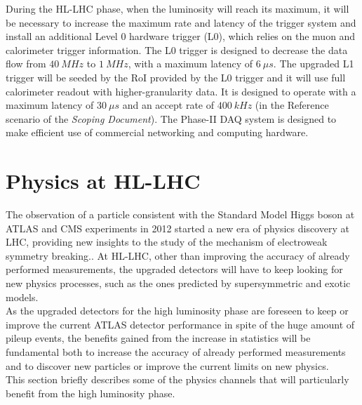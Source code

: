 \documentclass[a4paper,twoside,12pt]{article}
\begin{document}
During the HL-LHC phase, when the luminosity will reach its maximum, it will be necessary
to increase the maximum rate and latency of the trigger system and install an additional Level 0 hardware trigger (L0), which relies on the muon and calorimeter trigger information. The L0 trigger is designed to decrease the data flow from $40\ MHz$ to $1\ MHz$, with a maximum latency of $6\ \mu s$. The upgraded L1 trigger will be seeded by the RoI provided by the L0
trigger and it will use full calorimeter readout with higher-granularity data. It is designed to
operate with a maximum latency of $30\ \mu s$ and an accept rate of $400\ kHz$ (in the Reference scenario of the \textit{Scoping Document}\cite{scoping}). The Phase-II DAQ system is designed to make 
efficient use of commercial networking and computing hardware. 

\newpage

\section{Physics at HL-LHC}\label{sec:physics}

The observation of a particle consistent with the Standard Model Higgs boson at ATLAS and
CMS experiments in 2012 started a new era of physics discovery at LHC, providing
new insights to the study of the mechanism of electroweak symmetry breaking.\cite{loi}.
At HL-LHC, other than improving the accuracy of already performed measurements, the
upgraded detectors will have to keep looking for new physics processes, such as the ones
predicted by supersymmetric and exotic models. \\

As the upgraded detectors for the high luminosity phase are foreseen to keep or improve
the current ATLAS detector performance in spite of the huge amount of pileup events, the benefits gained from the increase in statistics
will be fundamental both to increase the accuracy of already performed measurements and
to discover new particles or improve the current limits on new physics.\\

This section briefly describes some of the physics channels that will particularly benefit
from the high luminosity phase.
\end{document}
